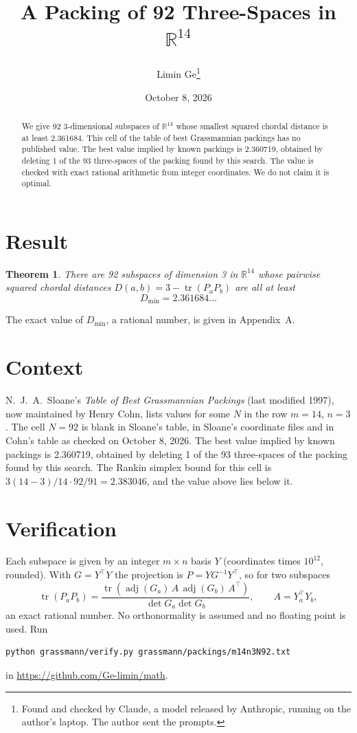 \documentclass[11pt,a4paper]{article}
\title{A Packing of 92 Three-Spaces in $\mathbb{R}^{14}$}
\author{Limin Ge\thanks{Found and checked by Claude, a model released by Anthropic, running on the author's laptop. The author sent the prompts.}}
\date{October 8, 2026}
\newtheorem*{theorem}{Theorem}
\begin{document}
\maketitle
\begin{abstract}
We give 92 3-dimensional subspaces of $\mathbb{R}^{14}$ whose smallest squared chordal distance is at least 2.361684. This cell of the table of best Grassmannian packings has no published value. The best value implied by known packings is 2.360719, obtained by deleting 1 of the 93 three-spaces of the packing found by this search. The value is checked with exact rational arithmetic from integer coordinates. We do not claim it is optimal.
\end{abstract}

\section{Result}
\begin{theorem}
There are 92 subspaces of dimension 3 in $\mathbb{R}^{14}$ whose pairwise squared chordal distances $D(a,b) = 3 - \operatorname{tr}(P_aP_b)$ are all at least
\[ D_{\min} = 2.361684\ldots \]
\end{theorem}
The exact value of $D_{\min}$, a rational number, is given in Appendix~A.


\section{Context}
N.~J.~A.~Sloane's \emph{Table of Best Grassmannian Packings} (last modified 1997), now maintained by Henry Cohn, lists values for some $N$ in the row $m=14$, $n=3$. The cell $N=92$ is blank in Sloane's table, in Sloane's coordinate files and in Cohn's table as checked on October 8, 2026. The best value implied by known packings is 2.360719, obtained by deleting 1 of the 93 three-spaces of the packing found by this search. The Rankin simplex bound for this cell is $3(14-3)/14\cdot 92/91 = 2.383046$, and the value above lies below it.


\section{Verification}
Each subspace is given by an integer $m\times n$ basis $Y$ (coordinates times $10^{12}$, rounded). With $G=Y^\top Y$ the projection is $P=YG^{-1}Y^\top$, so for two subspaces
\[ \operatorname{tr}(P_aP_b)=\frac{\operatorname{tr}(\operatorname{adj}(G_a)\,A\,\operatorname{adj}(G_b)\,A^\top)}{\det G_a\det G_b},\qquad A=Y_a^\top Y_b, \]
an exact rational number. No orthonormality is assumed and no floating point is used. Run
\begin{verbatim}
python grassmann/verify.py grassmann/packings/m14n3N92.txt
\end{verbatim}
in \url{https://github.com/Ge-limin/math}.
\end{document}
